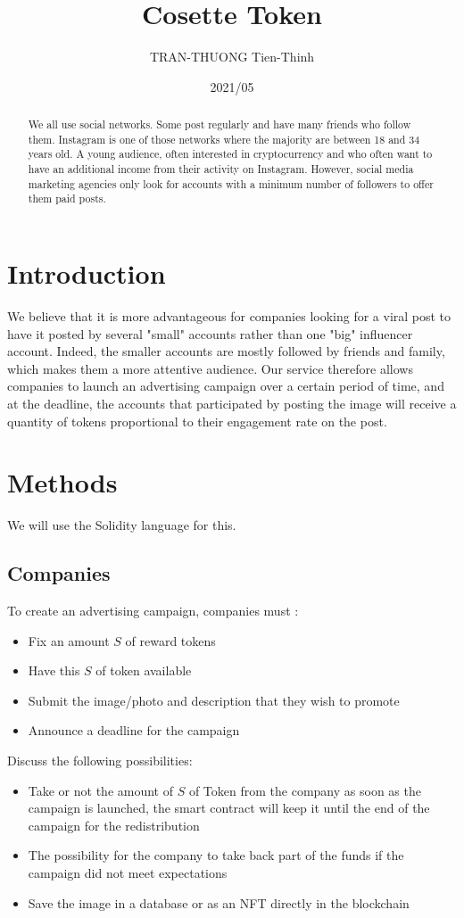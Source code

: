 \documentclass[10pt]{article}
\title{Cosette Token}
\author{TRAN-THUONG Tien-Thinh}
\date{2021/05}
\begin{document}
\maketitle

\begin{abstract}
We all use social networks. Some post regularly and have many friends who follow them. Instagram is one of those networks where the majority are between 18 and 34 years old. A young audience, often interested in cryptocurrency and who often want to have an additional income from their activity on Instagram. However, social media marketing agencies only look for accounts with a minimum number of followers to offer them paid posts.
\end{abstract}

\section{Introduction}
We believe that it is more advantageous for companies looking for a viral post to have it posted by several "small" accounts rather than one "big" influencer account. Indeed, the smaller accounts are mostly followed by friends and family, which makes them a more attentive audience. Our service therefore allows companies to launch an advertising campaign over a certain period of time, and at the deadline, the accounts that participated by posting the image will receive a quantity of tokens proportional to their engagement rate on the post.

\section{Methods}
We will use the Solidity language for this.  

\subsection{Companies}

To create an advertising campaign, companies must :
\begin{itemize}
  \item Fix an amount $S$ of reward tokens
  \item Have this $S$ of token available
  \item Submit the image/photo and description that they wish to promote
  \item Announce a deadline for the campaign
\end{itemize}
Discuss the following possibilities:
\begin{itemize}
  \item Take or not the amount of $S$ of Token from the company as soon as the campaign is launched, the smart contract will keep it until the end of the campaign for the redistribution
  \item The possibility for the company to take back part of the funds if the campaign did not meet expectations
  \item Save the image in a database or as an NFT directly in the blockchain
\end{itemize}
\end{document}
